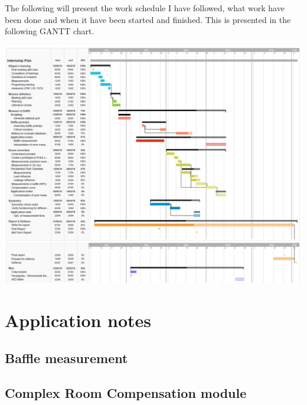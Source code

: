 \documentclass{report}
\begin{document}
\begin{appendices}
The following will present the work schedule I have followed, what work have been done and when it have been started and finished. This is presented in the following GANTT chart.

\begin{center}
	\includegraphics[width=\textwidth]{Appendix/Plan1} 
\end{center}


\chapter{Application notes}

\section{Baffle measurement}
\label{chap:AN_Baffle}


\section{Complex Room Compensation module}
\label{chap:AN_CRC}


\end{appendices}
\end{document}
